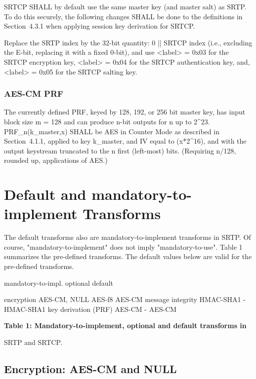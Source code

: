 \documentclass{article}
\begin{document}
SRTCP SHALL by default use the same master key (and master salt) as SRTP.  To do this securely, the following changes SHALL be done to the definitions in Section~4.3.1 when applying session key derivation for SRTCP.

Replace the SRTP index by the 32-bit quantity: 0 || SRTCP index (i.e., excluding the E-bit, replacing it with a fixed 0-bit), and use <label> = 0x03 for the SRTCP encryption key, <label> = 0x04 for the SRTCP authentication key, and, <label> = 0x05 for the SRTCP salting key.

\subsubsection{AES-CM PRF}

The currently defined PRF, keyed by 128, 192, or 256 bit master key, has input block size m = 128 and can produce n-bit outputs for n up to 2\textasciicircum{}23.  PRF\_n(k\_master,x) SHALL be AES in Counter Mode as described in Section~4.1.1, applied to key k\_master, and IV equal to (x*2\textasciicircum{}16), and with the output keystream truncated to the n first (left-most) bits.  (Requiring n/128, rounded up, applications of AES.)

\section{Default and mandatory-to-implement Transforms}

The default transforms also are mandatory-to-implement transforms in SRTP.  Of course, "mandatory-to-implement" does not imply "mandatory-to-use".  Table 1 summarizes the pre-defined transforms. The default values below are valid for the pre-defined transforms.

mandatory-to-impl.   optional     default

encryption            AES-CM, NULL         AES-f8       AES-CM message integrity     HMAC-SHA1              -          HMAC-SHA1 key derivation (PRF)  AES-CM                 -          AES-CM

\begin{center}
\textbf{Table 1: Mandatory-to-implement, optional and default transforms in}
\end{center}

SRTP and SRTCP.

\subsection{Encryption: AES-CM and NULL}
\end{document}
